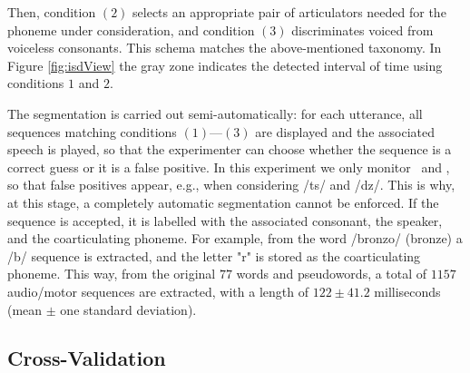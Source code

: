 Then, condition $(2)$ selects an appropriate pair of articulators needed for the
phoneme under consideration, and condition $(3)$ discriminates voiced from voiceless
consonants. This schema matches the above-mentioned taxonomy. In Figure
\ref{fig:isdView} the gray zone indicates the detected interval of time using conditions
$1$ and $2$.

The segmentation is carried out semi-automatically: for each
utterance, all sequences matching conditions $(1)$---$(3)$ are displayed and the
associated speech is played, so that the experimenter can choose whether the
sequence is a correct guess or it is a false positive. In this experiment we only
monitor \lio\ and \ttu, so that false positives appear, e.g., when considering
/ts/ and /dz/. This is why, at this stage, a completely automatic segmentation
cannot be enforced. If the sequence is accepted, it is labelled
with the associated consonant, the speaker, and the
coarticulating phoneme. For example, from the word /bronzo/ (bronze) a /b/
sequence is extracted, and the letter "r" is stored as the coarticulating phoneme.
This way, from the original $77$ words and pseudowords, a total
of $1157$ audio/motor sequences are extracted, with a length of $122 \pm 41.2$
milliseconds (mean $\pm$ one standard deviation).

%
%
%
%
%
%
%

\subsection{Cross-Validation}
\label{subsec:cv}

